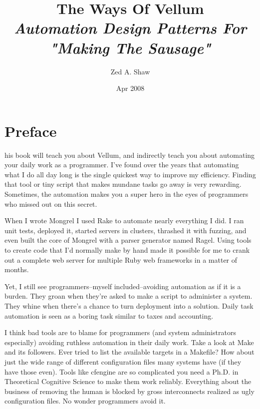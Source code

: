 


\usepackage{draftcopy}

\title{
    The Ways Of Vellum\\
    {\it Automation Design Patterns For "Making The Sausage"}
}
\author{Zed A. Shaw}
\date{Apr 2008}



\maketitle





\chapter*{Preface}

his book will teach you about Vellum, and indirectly teach you about
automating your daily work as a programmer.  I've found over the years that
automating what I do all day long is the single quickest way to improve my
efficiency.  Finding that tool or tiny script that makes mundane tasks go away
is very rewarding.  Sometimes, the automation makes you a super hero in the eyes
of programmers who missed out on this secret.

When I wrote Mongrel I used Rake to automate nearly everything I did.  I ran
unit tests, deployed it, started servers in clusters, thrashed it with fuzzing,
and even built the core of Mongrel with a parser generator named Ragel.  Using
tools to create code that I'd normally make by hand made it possible for me to
crank out a complete web server for multiple Ruby web frameworks in a matter of
months.

Yet, I still see programmers--myself included--avoiding automation as if it is
a burden.  They groan when they're asked to make a script to administer a
system.  They whine when there's a chance to turn deployment into a solution.
Daily task automation is seen as a boring task similar to taxes and accounting.

I think bad tools are to blame for programmers (and system administrators
especially) avoiding ruthless automation in their daily work.  Take a
look at Make and its followers.  Ever tried to list the available targets in a
Makefile?  How about just the wide range of different configuration files many
systems have (if they have those even).  Tools like cfengine are so complicated
you need a Ph.D. in Theoretical Cognitive Science to make them work reliably.
Everything about the business of removing the human is blocked by gross
interconnects realized as ugly configuration files.  No wonder programmers avoid
it.

